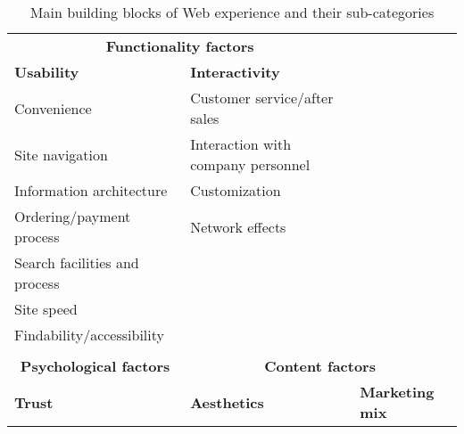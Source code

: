 \begin{table}[h]
    \centering
    \caption{Main building blocks of Web experience and their sub-categories 
    \cite{Constantinides2004}}
\label{tab:factors}
\begin{tabular}{lll}
    \cline{1-2}
    \multicolumn{2}{|c|}{\textbf{Functionality 
    factors}}                                               & 
    \textbf{}                                   \\ \cline{1-2}
    \multicolumn{1}{|l|}{\textbf{Usability}}             & 
    \multicolumn{1}{l|}{\textbf{Interactivity}} & 
    \textbf{}                                   \\ \cline{1-2}
    Convenience                                          & Customer 
    service/after sales                
    &                                             \\
    Site navigation                                      & Interaction with 
    company personnel          &                                             \\
    Information architecture                             & 
    Customization                               &                               
                  \\
    Ordering/payment process                             & Network 
    effects                             &                                       
          \\
    Search facilities and process                        
    &                                             &                             
                    \\
    Site speed                                           
    &                                             &                             
                    \\
    Findability/accessibility                            
    &                                             &                             
                    \\
    &                                             
    &                                             \\ \hline
    \multicolumn{1}{|c|}{\textbf{Psychological factors}} & 
    \multicolumn{2}{c|}{\textbf{Content 
    factors}}                                             \\ \hline
    \multicolumn{1}{|l|}{\textbf{Trust}}                 & 
    \multicolumn{1}{l|}{\textbf{Aesthetics}}    & 
    \multicolumn{1}{l|}{\textbf{Marketing mix}} \\ \hline

\end{tabular}
\end{table}
